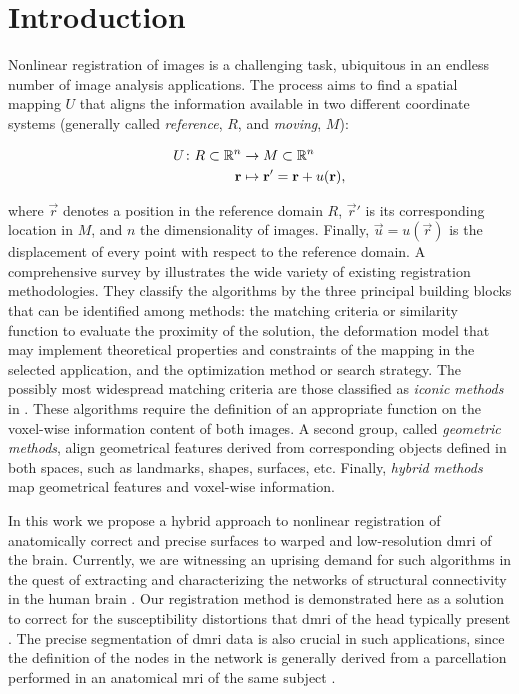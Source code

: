 \section*{Introduction}\label{sec:introduction}
Nonlinear registration of images is a challenging task, ubiquitous
  in an endless number of image analysis applications.
The process aims to find a spatial mapping $U$ that aligns the information available
  in two different coordinate systems (generally called
  \emph{reference}, $R$, and \emph{moving}, $M$):%

  \begin{align}
  U\colon R \subset \mathbb{R}^n &\to M \subset \mathbb{R}^n \notag\\
  \vec{r} &\mapsto \vec{r}' =\vec{r}+u(\vec{r}),
  \label{eq:transform}
  \end{align}

  where $\vec{r}$ denotes a position in the reference domain $R$, $\vec{r}'$ is
  its corresponding location in $M$, and $n$ the dimensionality of images.
Finally, $\vec{u} = u(\vec{r})$ is the displacement of every point with respect
  to the reference domain.
A comprehensive survey by \cite{sotiras_deformable_2013}
  illustrates the wide variety of existing registration methodologies.
They classify the algorithms by the three principal building blocks that can be identified
  among methods: the matching criteria or similarity function to evaluate the proximity of
  the solution, the deformation model that may implement theoretical properties and constraints
  of the mapping in the selected application, and the optimization method or search strategy.
The possibly most widespread matching criteria are those classified as \emph{iconic
  methods} in \citep{sotiras_deformable_2013}.
These algorithms require the definition of an appropriate function on the voxel-wise information
  content of both images.
A second group, called \emph{geometric methods}, align geometrical features derived from
  corresponding objects defined in both spaces, such as landmarks, shapes, surfaces, etc.
Finally, \emph{hybrid methods} map geometrical features and voxel-wise information.

In this work we propose a hybrid approach to nonlinear registration of anatomically correct
  and precise surfaces to warped and low-resolution \gls*{dmri} of the brain.
Currently, we are witnessing an uprising demand for such algorithms in the quest
  of extracting and characterizing the networks of structural connectivity in the
  human brain \citep{craddock_imaging_2013}.
Our registration method is demonstrated here as a solution to correct for the susceptibility
  distortions that \gls*{dmri} of the head typically present \citep{jezzard_correction_1995}.
The precise segmentation of \gls*{dmri} data is also crucial in such applications, since the
  definition of the nodes in the network is generally derived from a parcellation performed in
  an anatomical \gls*{mri} of the same subject \citep{daducci_connectome_2012}.

